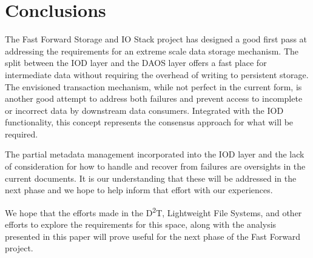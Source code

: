 \documentclass[conference]{sig-alt-gov2}
\newcommand{\DDTns}{D\textsuperscript{2}T}
\begin{document}
\section{Conclusions}
\label{sec:conclusion}

The Fast Forward Storage and IO Stack project has designed a good first pass at
addressing the requirements for an extreme scale data storage mechanism. The
split between the IOD layer and the DAOS layer offers a fast place for
intermediate data without requiring the overhead of writing to persistent
storage. The envisioned transaction mechanism, while not perfect in the current
form, is another good attempt to address both failures and prevent access to
incomplete or incorrect data by downstream data consumers. Integrated with the
IOD functionality, this concept represents the consensus approach for what will
be required.

The partial metadata management incorporated into the IOD layer and the lack of
consideration for how to handle and recover from failures are oversights in the
current documents. It is our understanding that these will be addressed in the
next phase and we hope to help inform that effort with our experiences.

We hope that the efforts made in the \DDTns, Lightweight File Systems, and
other efforts to explore the requirements for this space, along with the
analysis presented in this paper will prove useful for the next phase of the
Fast Forward project.
\end{document}
